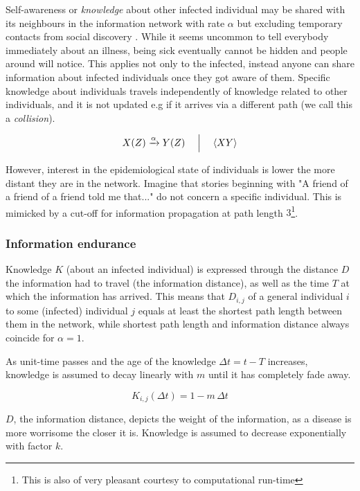 \documentclass[11pt]{article}
\begin{document}
Self-awareness or {\it knowledge} about other infected individual may be shared with its neighbours in the information network with rate $\alpha$ but excluding temporary contacts from social discovery .
While it seems uncommon to tell everybody immediately about an illness, being sick eventually cannot be hidden and people around will notice.
This applies not only to the infected, instead anyone can share information about infected individuals once they got aware of them.
Specific knowledge about individuals travels independently of knowledge related to other individuals, and it is not updated e.g if it arrives via a different path (we call this a {\it collision}).

\begin{equation}
 X( Z)\xrightarrow\alpha Y(Z)  \quad  \Bigm| \quad \langle XY\rangle
\end{equation}

However, interest in the epidemiological state of individuals is lower the more distant they are in the network. Imagine that stories beginning with "A friend of a friend of a friend told me that..." do not concern a specific individual. This is mimicked by a cut-off for information propagation at path length $3$\footnote{This is also of very pleasant courtesy to computational run-time}.

\subsubsection*{Information endurance}

Knowledge $ K$ (about an infected individual) is expressed through the distance $ D$ the information had to travel (the information distance), as well as the time $ T$ at which the information has arrived.
This means that $ D_{i,j}$ of a general individual $ i$ to some (infected) individual $ j$ equals at least the shortest path length between them in the network, while shortest path length and information distance always coincide for $ \alpha = 1$.

As unit-time passes and the age of the knowledge $ \Delta t = t - T$  increases, knowledge is assumed to decay linearly with $ m$ until it has completely fade away.

\begin{equation}
K_{i,j}(\Delta t) =  1 -  m \, \Delta t
\end{equation}

$ D$, the information distance, depicts the weight of the information, as a disease is more worrisome the closer it is. Knowledge is assumed to decrease exponentially with factor $ k$.
\end{document}
